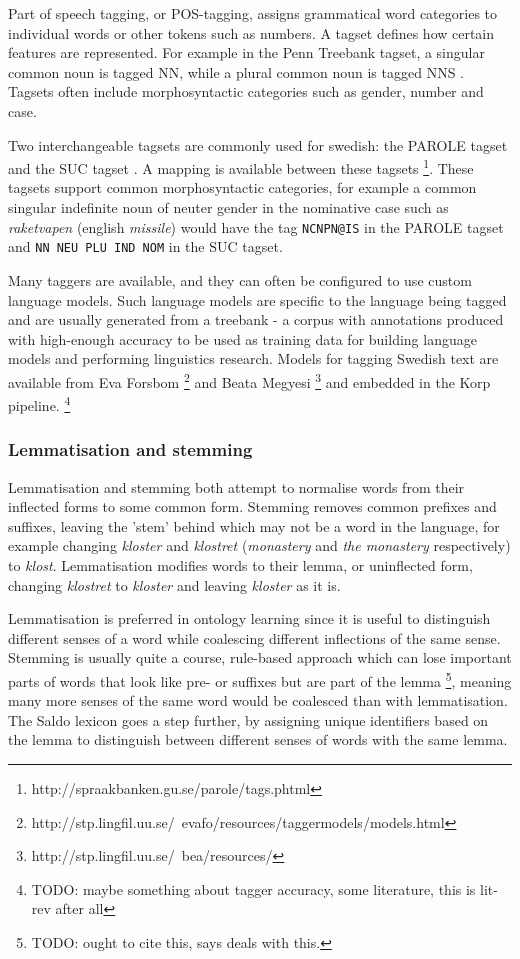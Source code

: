 \documentclass[a4paper]{report}
\newcommand{\todo}[1]{\footnote{{\color{red} TODO: #1}}}
\begin{document}
Part of speech tagging, or POS-tagging, assigns grammatical word categories to individual words or other tokens such as numbers.
A tagset defines how certain features are represented.
For example in the Penn Treebank tagset, a singular common noun is tagged NN, while a plural common noun is tagged NNS \citep{Marcus93Penn}.
Tagsets often include morphosyntactic categories such as gender, number and case.

Two interchangeable tagsets are commonly used for swedish: the PAROLE tagset and the SUC tagset \citep{Forsbom08Tagging}.
A mapping is available between these tagsets \footnote{http://spraakbanken.gu.se/parole/tags.phtml}.
These tagsets support common morphosyntactic categories, for example a common singular indefinite noun of neuter gender in the nominative case such as \emph{raketvapen} (english \emph{missile}) would have the tag {\tt NCNPN@IS} in the PAROLE tagset and {\tt NN NEU PLU IND NOM} in the SUC tagset.

Many taggers are available, and they can often be configured to use custom language models. Such language models are specific to the language being tagged and are usually generated from a treebank - a corpus with annotations produced with high-enough accuracy to be used as training data for building language models and performing linguistics research.
Models for tagging Swedish text are available from Eva Forsbom \footnote{http://stp.lingfil.uu.se/~evafo/resources/taggermodels/models.html} and Beata Megyesi \footnote{http://stp.lingfil.uu.se/~bea/resources/} and embedded in the Korp pipeline. \todo{maybe something about tagger accuracy, some literature, this is lit-rev after all}

\subsubsection{Lemmatisation and stemming}

Lemmatisation and stemming both attempt to normalise words from their inflected forms to some common form.
Stemming removes common prefixes and suffixes, leaving the 'stem' behind which may not be a word in the language, for example changing \emph{kloster} and \emph{klostret} (\emph{monastery} and \emph{the monastery} respectively) to \emph{klost}.
Lemmatisation modifies words to their lemma, or uninflected form, changing \emph{klostret} to \emph{kloster} and leaving \emph{kloster} as it is.

Lemmatisation is preferred in ontology learning since it is useful to distinguish different senses of a word while coalescing different inflections of the same sense.
Stemming is usually quite a course, rule-based approach which can lose important parts of words that look like pre- or suffixes but are part of the lemma \todo{ought to cite this, \citep{Gacitua08OntoLancs} says \citep{Alkula01MeaningWords} deals with this.}, meaning many more senses of the same word would be coalesced than with lemmatisation.
The Saldo lexicon \cite{Borin09Saldo} goes a step further, by assigning unique identifiers based on the lemma to distinguish between different senses of words with the same lemma.
\end{document}
